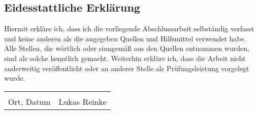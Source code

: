 \subsection*{Eidesstattliche Erklärung}
Hiermit erkläre ich, dass ich die vorliegende Abschlussarbeit selbständig verfasst und keine anderen als die angegeben Quellen und Hilfsmittel verwendet habe.
Alle Stellen, die wörtlich oder sinngemäß aus den Quellen entnommen wurden, sind als solche kenntlich gemacht.
Weiterhin erkläre ich, dass die Arbeit nicht anderweitig veröffentlicht oder an anderer Stelle als Prüfungsleistung vorgelegt wurde.

\vspace{50px}

\begin{tabular}{@{}p{2.5in}p{2.5in}@{}}
  \dotfill & \dotfill \\
  Ort, Datum & Lukas Reinke \\[5\bigskipamount]
\end{tabular}

\pagebreak
\ \\
\pagebreak